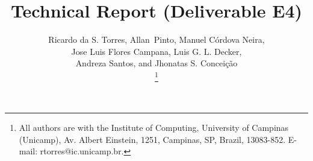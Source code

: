 \documentclass[journal, onecolumn, 12pt]{IEEEtran}
\begin{document}
    \title{Technical Report (Deliverable E4)}
    
    \author{
        Ricardo da S. Torres,
        Allan~Pinto,
        Manuel C\'{o}rdova Neira,\\
        Jose Luis Flores Campana,
        Luis G. L. Decker, \\
        Andreza Santos, and
        Jhonatas S. Concei\c{c}\~{a}o

        \thanks{All authors are with the Institute of Computing, University of Campinas (Unicamp), Av. Albert Einstein, 1251, Campinas, SP, Brazil, 13083-852. E-mail: rtorres@ic.unicamp.br.}%

        }
    
    
\end{document}
